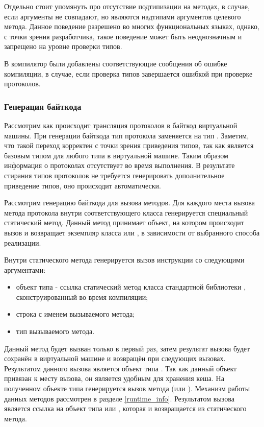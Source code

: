 Отдельно стоит упомянуть про отсутствие подтипизации на методах, в случае, если аргументы не совпадают, но являются надтипами аргументов целевого метода. Данное поведение разрешено во многих функциональных языках, однако, с точки зрения разработчика, такое поведение может быть неоднозначным и запрещено на уровне проверки типов.

В компилятор были добавлены соответствующие сообщения об ошибке компиляции, в случае, если проверка типов завершается ошибкой при проверке протоколов.

\subsubsection{Генерация байткода}
Рассмотрим как происходит трансляция протоколов в байткод виртуальной машины. При генерации байткода тип протокола заменяется на тип . Заметим, что такой переход корректен с точки зрения приведения типов, так как  является базовым типом для любого типа в виртуальной машине. Таким образом информация о протоколах отсутствует во время выполнения. В результате стирания типов протоколов не требуется генерировать дополнительное приведение типов, оно происходит автоматически.

Рассмотрим генерацию байткода для вызова методов. Для каждого места вызова метода протокола внутри соответствующего класса генерируется специальный статический метод. Данный метод принимает объект, на котором происходит вызов и возвращает экземпляр класса  или , в зависимости от выбранного способа реализации.

Внутри статического метода генерируется вызов инструкции  со следующими аргументами:
\begin{itemize}
  \item объект типа  - ссылка статический метод  класса стандартной библиотеки , сконструированный во время компиляции;
  \item строка с именем вызываемого метода;
  \item тип вызываемого метода.
\end{itemize}

Данный метод будет вызван только в первый раз, затем результат вызова будет сохранён в виртуальной машине и возвращён при следующих вызовах. Результатом данного вызова является объект типа . Так как данный объект привязан к месту вызова, он является удобным для хранения кеша. На полученном объекте типа  генерируется вызов метода (или ). Механизм работы данных методов рассмотрен в разделе \ref{runtime_info}. Результатом вызова является ссылка на объект типа  или , которая и возвращается из статического метода.

